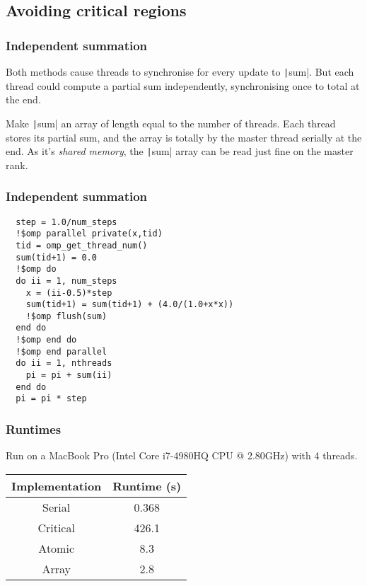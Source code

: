 \documentclass{beamer}
\begin{document}
\subsection{Avoiding critical regions}
\begin{frame}
\frametitle{Independent summation}
Both methods cause threads to synchronise for every update to \texttt|sum|.
But each thread could compute a partial sum independently, synchronising once to total at the end.

Make \texttt|sum| an array of length equal to the number of threads.
Each thread stores its partial sum, and the array is totally by the master thread serially at the end.
As it's \emph{shared memory}, the \texttt|sum| array can be read just fine on the master rank.
\end{frame}

\begin{frame}[fragile]
\frametitle{Independent summation}
\begin{verbatim}
  step = 1.0/num_steps
  !$omp parallel private(x,tid)
  tid = omp_get_thread_num()
  sum(tid+1) = 0.0
  !$omp do
  do ii = 1, num_steps
    x = (ii-0.5)*step
    sum(tid+1) = sum(tid+1) + (4.0/(1.0+x*x))
    !$omp flush(sum)
  end do
  !$omp end do
  !$omp end parallel
  do ii = 1, nthreads
    pi = pi + sum(ii)
  end do
  pi = pi * step
\end{verbatim}
\end{frame}

\begin{frame}
\frametitle{Runtimes}
Run on a MacBook Pro (Intel Core i7-4980HQ CPU @ 2.80GHz) with 4 threads.

\begin{table}
\begin{tabular}{cc}
\toprule
Implementation & Runtime (s) \\
\midrule
Serial   & 0.368 \\
Critical & 426.1 \\
Atomic   & 8.3 \\
Array    & 2.8 \\
\bottomrule
\end{tabular}
\end{table}
\end{frame}
\end{document}
